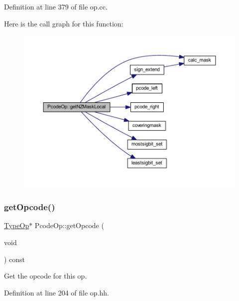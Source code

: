 Definition at line 379 of file op.\+cc.

Here is the call graph for this function\+:
\nopagebreak
\begin{figure}[H]
\begin{center}
\leavevmode
\includegraphics[width=350pt]{class_pcode_op_a7c598d70b51160ff643b92a1619e1929_cgraph}
\end{center}
\end{figure}
\mbox{\label{class_pcode_op_a1aa053ae15310104954779d0021c63ca}} 
\subsubsection{\texorpdfstring{getOpcode()}{getOpcode()}}
{\footnotesize\ttfamily \mbox{\hyperlink{class_type_op}{Type\+Op}}$\ast$ Pcode\+Op\+::get\+Opcode (\begin{DoxyParamCaption}\item[{void}]{ }\end{DoxyParamCaption}) const\hspace{0.3cm}{\ttfamily [inline]}}



Get the opcode for this op. 



Definition at line 204 of file op.\+hh.

\mbox{\label{class_pcode_op_a41be82b850ff5185e51268aead2c2802}} 

